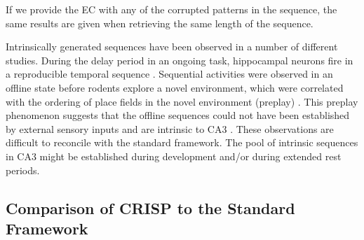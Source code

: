 \documentclass[utf8]{frontiersSCNS} %
\begin{document}
If we provide the EC with any of the corrupted patterns in the sequence, the same results are given when retrieving the same length of the sequence.  



Intrinsically generated sequences have been observed in a number of different studies. During the delay period in an ongoing task, hippocampal neurons fire in a reproducible temporal sequence \cite{pastalkova2008internally, macdonald2011hippocampal}.  Sequential activities were observed in an offline state before rodents explore a novel environment, which were correlated with the ordering of place fields in the novel environment (preplay) \cite{dragoi2011preplay}. This preplay phenomenon suggests that the offline sequences could not have been established by external sensory inputs and are intrinsic to CA3 \cite{azizi2013computational}. These observations are difficult to reconcile with the standard framework. The pool of intrinsic sequences in CA3 might be established during development and/or during extended rest periods.  


\subsection{Comparison of CRISP to the Standard Framework}



\end{document}
